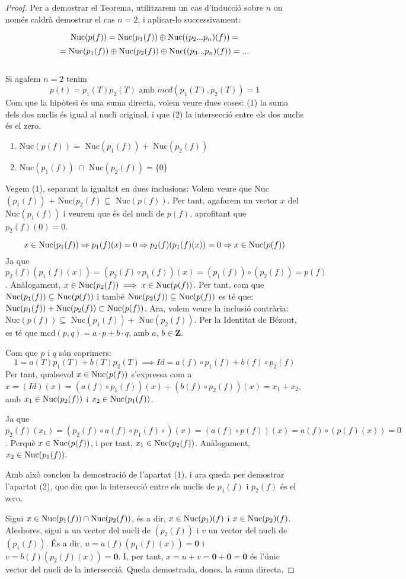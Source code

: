 \begin{proof}

Per a demostrar el Teorema, utilitzarem un cas d'inducció sobre $n$ on només caldrà demostrar el cas $n = 2$, i aplicar-lo successivament:

$$\operatorname{Nuc}(p(f)) = \operatorname{Nuc}(p_1(f)) \oplus \operatorname{Nuc}((p_2 ... p_n)(f)) =$$
$$= \operatorname{Nuc}(p_1(f)) \oplus \operatorname{Nuc}(p_2(f)) \oplus \operatorname{Nuc}((p_3 ... p_n)(f)) = ...$$\\
Si agafem $n=2$ tenim
$$p(t) = p_1(T) p_2(T)\text{ amb }mcd(p_1(T), p_2(T)) = 1$$
Com que la hipòtesi és una suma directa, volem veure dues coses: (1) la suma dels dos nuclis és igual al nucli original, i que (2) la intersecció entre els dos nuclis és el zero. 

\begin{enumerate}
    \item Nuc$(p(f)) =$ Nuc$(p_1(f)) +$ Nuc$(p_2(f))$
    \item Nuc$(p_1(f)) \; \cap$ Nuc$(p_2(f)) = \{0\}$
\end{enumerate}
Vegem (1), separant la igualtat en dues inclusions:
Volem veure que Nuc$(p_1(f))$ $+$ Nuc$(p_2(f) \subseteq $ Nuc$(p(f))$. Per tant, agafarem un vector $x$ del Nuc$(p_1(f))$ i veurem que és del nucli de $p(f)$, aprofitant que $p_2(f)(0) = 0$.

$$x \in \operatorname{Nuc}(p_1(f)) \Rightarrow p_1(f)(x) = 0 \Rightarrow p_2(f)(p_1(f)(x)) = 0 \Rightarrow x \in \operatorname{Nuc}(p(f))$$
Ja que $p_2(f)(p_1(f)(x)) = (p_2(f) \circ p_1(f))(x) = (p_1(f)) \circ (p_2(f)) = p(f)$. Anàlogament, $x \in \operatorname{Nuc}(p_2(f)) \implies x \in \operatorname{Nuc}(p(f))$. Per tant, com que $\operatorname{Nuc}(p_1(f)) \subseteq \operatorname{Nuc}(p(f))$ i també $\operatorname{Nuc}(p_2(f)) \subseteq \operatorname{Nuc}(p(f))$ es té que: $\operatorname{Nuc}(p_1(f)) + \operatorname{Nuc}(p_2(f)) \subset \operatorname{Nuc}(p(f))$.
Ara, volem veure la inclusió contrària: Nuc$(p(f)) \subseteq $ Nuc$(p_1(f)) +$ Nuc$(p_2(f))$. Per la Identitat de Bézout, es té que mcd$(p, q) = a \cdot p + b \cdot q$, amb $a$, $b \in \mathbf{Z}$.

Com que $p$ i $q$ són coprimers:
$$1 = a(T)p_1(T) + b(T)p_2(T) \implies Id = a(f) \circ p_1(f) + b(f) \circ p_2(f)$$
Per tant, qualsevol $x \in \operatorname{Nuc}(p(f))$ s'expressa com a $x = (Id)(x) = (a(f)\circ p_1(f))(x) + (b(f)\circ p_2(f))(x) = x_1 + x_2$, amb $x_1 \in \operatorname{Nuc}(p_2(f))$ i $x_2 \in \operatorname{Nuc}(p_1(f))$.

Ja que $p_2(f)(x_1) = (p_2(f)\circ a(f)\circ p_1(f)\circ)(x) = (a(f)\circ p(f))(x) = a(f)\circ (p(f)(x)) = 0$. Perquè $x \in \operatorname{Nuc}(p(f))$, i per tant, $x_1 \in \operatorname{Nuc}(p_2(f))$. Anàlogament, $x_2 \in \operatorname{Nuc}(p_1(f))$.

Amb això conclou la demostració de l'apartat (1), i ara queda per demostrar l'apartat (2), que diu que la intersecció entre els nuclis de $p_1(f)$ i $p_2(f)$ és el zero.

Sigui $x \in \operatorname{Nuc}(p_1(f)) \cap \operatorname{Nuc}(p_2(f))$, és a dir, $x \in \operatorname{Nuc}(p_1)(f)$ i $x \in \operatorname{Nuc}(p_2)(f)$. Aleshores, sigui $u$ un vector del nucli de $(p_2(f))$ i $v$ un vector del nucli de $(p_1(f))$. És a dir, ${u} = a(f)(p_1(f)(x)) = \mathbf{0}$ i ${v} = b(f)(p_2(f)(x)) = \mathbf{0}$. I, per tant, ${x} = {u} + {v} = \mathbf{0} + \mathbf{0} = \mathbf{0}$ és l'únic vector del nucli de la intersecció.
Queda demostrada, doncs, la suma directa.
\end{proof}
